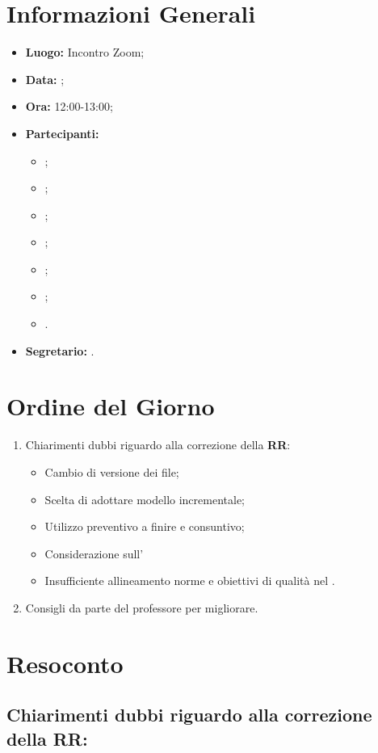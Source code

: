 \section{Informazioni Generali}
\begin{itemize}
\item \textbf{Luogo:} Incontro Zoom;
\item \textbf{Data:} \Data;
\item \textbf{Ora:} 12:00-13:00;
\item \textbf{Partecipanti:}
	\begin{itemize}
		\item \BL{}; 
		\item \FF{};
		\item \MM{};
		\item \TG{};
		\item \TL{};
		\item \VD{};
		\item \VT{}.
	\end{itemize} 
\item \textbf{Segretario:} \MM{}.
\end{itemize}

\section{Ordine del Giorno}
\begin{enumerate}
	\item Chiarimenti dubbi riguardo alla correzione della \textbf{RR}:
	\begin{itemize}
        \item Cambio di versione dei file;
        \item Scelta di adottare modello incrementale;
        \item Utilizzo preventivo a finire e consuntivo;
        \item Considerazione sull'\AdR\;
        \item Insufficiente allineamento norme e obiettivi di qualità nel \PdQ{}.
    \end{itemize}
	\item Consigli da parte del professore per migliorare.
\end{enumerate}

\section{Resoconto}
\subsection{Chiarimenti dubbi riguardo alla correzione della RR:}
